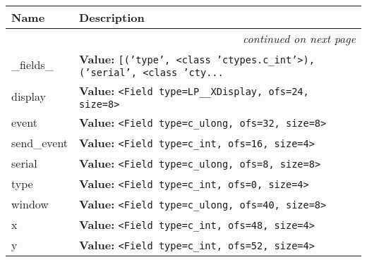     \vspace{-1cm}
\hspace{\varindent}\begin{longtable}{|p{\varnamewidth}|p{\vardescrwidth}|l}
\cline{1-2}
\cline{1-2} \centering \textbf{Name} & \centering \textbf{Description}& \\
\cline{1-2}
\endhead\cline{1-2}\multicolumn{3}{r}{\small\textit{continued on next page}}\\\endfoot\cline{1-2}
\endlastfoot\raggedright \_\-f\-i\-e\-l\-d\-s\-\_\- & \raggedright \textbf{Value:} 
{\tt \texttt{[}\texttt{(}\texttt{'}\texttt{type}\texttt{'}\texttt{, }{\textless}class 'ctypes.c\_int'{\textgreater}\texttt{)}\texttt{, }\texttt{(}\texttt{'}\texttt{serial}\texttt{'}\texttt{, }{\textless}class 'cty\texttt{...}}&\\
\cline{1-2}
\raggedright d\-i\-s\-p\-l\-a\-y\- & \raggedright \textbf{Value:} 
{\tt {\textless}Field type=LP\_\_XDisplay, ofs=24, size=8{\textgreater}}&\\
\cline{1-2}
\raggedright e\-v\-e\-n\-t\- & \raggedright \textbf{Value:} 
{\tt {\textless}Field type=c\_ulong, ofs=32, size=8{\textgreater}}&\\
\cline{1-2}
\raggedright s\-e\-n\-d\-\_\-e\-v\-e\-n\-t\- & \raggedright \textbf{Value:} 
{\tt {\textless}Field type=c\_int, ofs=16, size=4{\textgreater}}&\\
\cline{1-2}
\raggedright s\-e\-r\-i\-a\-l\- & \raggedright \textbf{Value:} 
{\tt {\textless}Field type=c\_ulong, ofs=8, size=8{\textgreater}}&\\
\cline{1-2}
\raggedright t\-y\-p\-e\- & \raggedright \textbf{Value:} 
{\tt {\textless}Field type=c\_int, ofs=0, size=4{\textgreater}}&\\
\cline{1-2}
\raggedright w\-i\-n\-d\-o\-w\- & \raggedright \textbf{Value:} 
{\tt {\textless}Field type=c\_ulong, ofs=40, size=8{\textgreater}}&\\
\cline{1-2}
\raggedright x\- & \raggedright \textbf{Value:} 
{\tt {\textless}Field type=c\_int, ofs=48, size=4{\textgreater}}&\\
\cline{1-2}
\raggedright y\- & \raggedright \textbf{Value:} 
{\tt {\textless}Field type=c\_int, ofs=52, size=4{\textgreater}}&\\
\cline{1-2}
\end{longtable}



